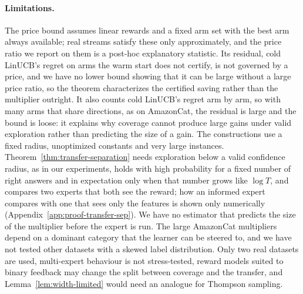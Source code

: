\documentclass[anon]{alt2027} %
\begin{document}
\paragraph{Limitations.}
The price bound assumes linear rewards and a fixed arm set with the best arm
always available; real streams satisfy these only approximately, and the
price ratio we report on them is a post-hoc explanatory statistic. Its
residual, cold LinUCB's regret on arms the warm start does not certify, is
not governed by a price, and we have no lower bound showing that it can be
large without a large price ratio, so the theorem characterizes the
certified saving rather than the multiplier outright. It also counts cold
LinUCB's regret arm by arm, so with many arms that share directions, as on
AmazonCat, the residual is large and the bound is loose: it explains why
coverage cannot produce large gains under valid exploration rather than
predicting the size of a gain. The constructions use a
fixed radius, unoptimized constants and very large instances.
Theorem~\ref{thm:transfer-separation} needs exploration below a valid
confidence radius, as in our experiments, holds with high probability for a
fixed number of right answers and in expectation only when that number grows
like $\log T$, and compares two experts that both see the reward; how an informed expert
compares with one that sees only the features is shown only numerically
(Appendix~\ref{app:proof-transfer-sep}). We have no estimator that predicts
the size of the multiplier before the expert is run. The large AmazonCat
multipliers depend on a dominant category that the learner can be steered
to, and we have not tested other datasets with a skewed label distribution.
Only two real datasets are used, multi-expert behaviour is not stress-tested,
reward models suited to binary feedback may change the split between
coverage and the transfer, and Lemma~\ref{lem:width-limited} would need an
analogue for Thompson sampling.






\appendix
\end{document}
